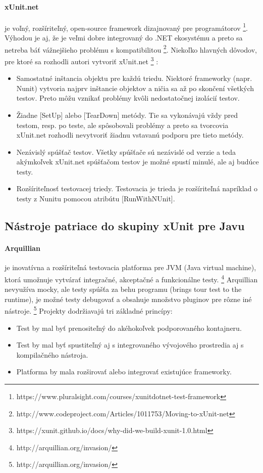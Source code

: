 \documentclass[11pt,twoside,slovak,a4paper]{article}
\begin{document}
		\paragraph{xUnit.net} je voľný, rozšíriteľný, open-source framework dizajnovaný pre programátorov \footnote{https://www.pluralsight.com/courses/xunitdotnet-test-framework}.
		Výhodou je aj, že je veľmi dobre integrovaný do .NET ekosystému a preto sa netreba báť vážnejšieho problému s kompatibilitou \footnote{http://www.codeproject.com/Articles/1011753/Moving-to-xUnit-net}.
		Niekoľko hlavných dôvodov, pre ktoré sa rozhodli autori vytvoriť xUnit.net \footnote{https://xunit.github.io/docs/why-did-we-build-xunit-1.0.html} :
		\begin{itemize}
			\item Samostatné inštancia objektu pre každú triedu. Niektoré frameworky (napr. Nunit) vytvoria najprv inštancie objektov a ničia sa až po skončení všetkých testov. Preto môžu vznikať problémy kvôli nedostatočnej izolácií testov.
			\item Žiadne [SetUp] alebo [TearDown] metódy. Tie sa vykonávajú vždy pred testom, resp. po teste, ale spôsobovali problémy a preto sa tvorcovia xUnit.net rozhodli nevytvoriť žiadnu vstavanú podporu pre tieto metódy.
			\item Nezávislý spúšťač testov. Všetky spúšťače sú nezávislé od verzie a teda akýmkoľvek xUnit.net spúšťačom testov je možné spustí minulé, ale aj budúce testy.
			\item Rozšíriteľnosť testovacej triedy. Testovacia je trieda je rozšíriteľná napríklad o testy z Nunitu pomocou atribútu [RunWithNUnit].
		\end{itemize}
		
	\subsection{Nástroje patriace do skupiny xUnit pre Javu}
		\paragraph{Arquillian} je inovatívna a rozšíriteľná testovacia platforma pre JVM (Java virtual machine), ktorá umožnuje vytvárať integračné, akceptačné a funkcionálne testy. \footnote{http://arquillian.org/invasion/} Arquillian nevyužíva mocky, ale testy spúšťa za behu programu (brings tour test to the runtime), je možné testy debugovať a obsahuje množstvo pluginov pre rôzne iné nástroje. \footnote{http://arquillian.org/invasion/}
		Projekty dodržiavajú tri základné princípy:
		\begin{itemize}
			\item Test by mal byť prenositeľný do akéhokoľvek podporovaného kontajneru.
			\item Test by mal byť spustiteľný aj s integrovaného vývojového prostredia aj s kompilačného nástroja.
			\item Platforma by mala rozširovať alebo integrovať existujúce frameworky.
		\end{itemize}
		
\end{document}
